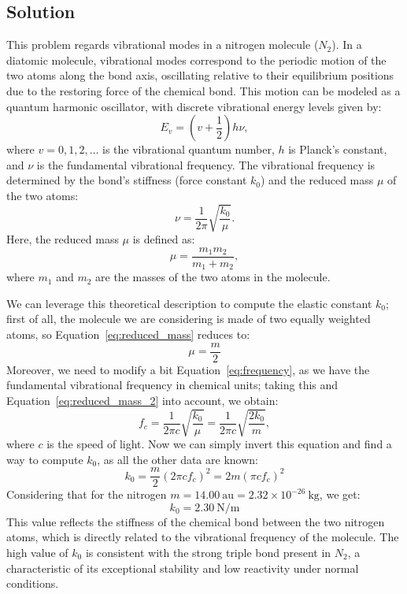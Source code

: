 \documentclass[prl, 11 pt]{revtex4-2}
\begin{document}
\subsection{Solution}
This problem regards vibrational modes in a nitrogen molecule ($N_2$). In a diatomic molecule, vibrational modes correspond to the periodic motion of the two atoms along the bond axis, oscillating relative to their equilibrium positions due to the restoring force of the chemical bond. This motion can be modeled as a quantum harmonic oscillator, with discrete vibrational energy levels given by:
%
\begin{equation}
    E_v = \left(v + \frac{1}{2}\right)h\nu,
\end{equation}
%
where $v = 0, 1, 2, \dots$ is the vibrational quantum number, $h$ is Planck's constant, and $\nu$ is the fundamental vibrational frequency. The vibrational frequency is determined by the bond's stiffness (force constant $k_0$) and the reduced mass $\mu$ of the two atoms:
%
\begin{equation}
    \label{eq:frequency}
    \nu = \frac{1}{2\pi}\sqrt{\frac{k_0}{\mu}}.
\end{equation}
%
Here, the reduced mass $\mu$ is defined as:
%
\begin{equation}
    \label{eq:reduced_mass}
    \mu = \frac{m_1 m_2}{m_1 + m_2},
\end{equation}
%
where $m_1$ and $m_2$ are the masses of the two atoms in the molecule.

We can leverage this theoretical description to compute the elastic constant $k_0$; first of all, the molecule we are considering is made of two equally weighted atoms, so Equation~\eqref{eq:reduced_mass} reduces to:
%
\begin{equation}
    \label{eq:reduced_mass_2}
    \mu = \frac{m}{2}
\end{equation}
%
Moreover, we need to modify a bit Equation~\eqref{eq:frequency}, as we have the fundamental vibrational frequency in chemical units; taking this and Equation~\eqref{eq:reduced_mass_2} into account, we obtain:
%
\begin{equation}
    f_c= \frac{1}{2\pi c}\sqrt{\frac{k_0}{\mu}} = \frac{1}{2\pi c}\sqrt{\frac{2k_0}{m}} ,
\end{equation}
where $c$ is the speed of light. Now we can simply invert this equation and find a way to compute $k_0$, as all the other data are known:
%
\begin{equation}
    \label{eq:k_0}
    k_0 = \frac{m}{2} (2\pi c f_c)^2 = 2m (\pi c f_c)^2
\end{equation}
%
Considering that for the nitrogen $m = 14.00~\text{au} = 2.32 \times 10^{-26}~\si{\kilo\gram}$, we get:
$$
    k_0 = 2.30~\si{\newton}/\si{\meter}
$$
This value reflects the stiffness of the chemical bond between the two nitrogen atoms, which is directly related to the vibrational frequency of the molecule. The high value of $k_0$ is consistent with the strong triple bond present in $N_2$, a characteristic of its exceptional stability and low reactivity under normal conditions.
\end{document}

